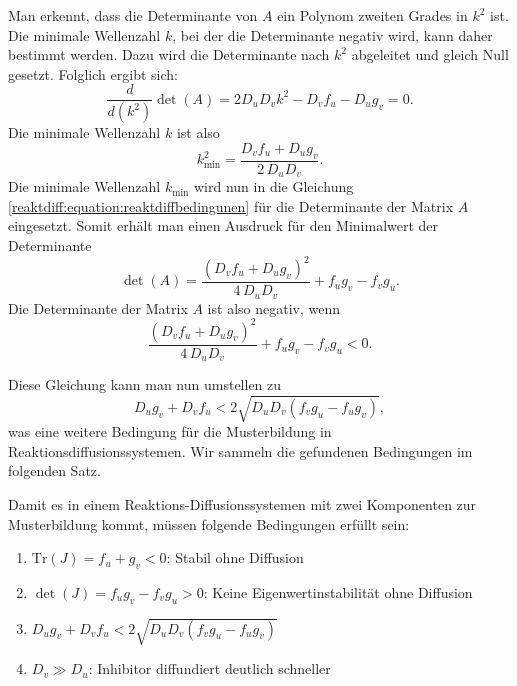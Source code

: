 Man erkennt, dass die Determinante von \(A\) ein Polynom zweiten Grades in \(k^2\) ist.  
Die minimale Wellenzahl \(k\), bei der die Determinante negativ wird, kann daher bestimmt werden.  
Dazu wird die Determinante nach \(k^2\) abgeleitet und gleich Null gesetzt.  
Folglich ergibt sich:
\begin{equation*}
    \frac{d}{d \left(k^2\right)} \det(A) = 2 D_u D_v k^2 - D_v f_u - D_u g_v = 0.
\end{equation*}
Die minimale Wellenzahl \(k\) ist also
\begin{equation*}
    k^2_{\text{min}} = \frac{D_v f_u + D_u g_v}{2\, D_u D_v}.
\end{equation*}
Die minimale Wellenzahl \(k_{\text{min}}\) wird nun in die Gleichung \eqref{reaktdiff:equation:reaktdiffbedingunen} für die Determinante der Matrix \(A\) eingesetzt.
Somit erhält man einen Ausdruck für den Minimalwert der Determinante
\begin{equation*}
    \det(A) = \frac{(D_v f_u + D_u g_v)^2}{4\, D_u D_v} + f_u g_v - f_v g_u.
\end{equation*}
Die Determinante der Matrix \(A\) ist also negativ, wenn
\begin{equation*}
    \frac{(D_v f_u + D_u g_v)^2}{4\, D_u D_v} + f_u g_v - f_v g_u < 0.
\end{equation*}

Diese Gleichung kann man nun umstellen zu
\begin{equation*}
    D_u g_v+D_v f_u < 2\sqrt{D_u D_v(f_v g_u - f_u g_v)} ,
\end{equation*}
was eine weitere Bedingung für die Musterbildung in Reaktionsdiffusionssystemen.
Wir sammeln die gefundenen Bedingungen im folgenden Satz.
\begin{satz}
\label{reaktdiff:satz:bedingungen}
Damit es in einem Reaktions-Diffusionssystemen mit zwei Komponenten zur Musterbildung kommt, müssen folgende Bedingungen erfüllt sein:
\begin{enumerate}
    \item \(\text{Tr}(J) = f_u + g_v < 0\): Stabil ohne Diffusion
    \item \(\det(J) = f_u g_v - f_v g_u > 0\): Keine Eigenwertinstabilität ohne Diffusion
    \item \(D_u g_v+D_v f_u < 2\sqrt{D_u D_v(f_v g_u - f_u g_v)}\)
    \item \(D_v \gg D_u\): Inhibitor diffundiert deutlich schneller
\end{enumerate}
\end{satz}

